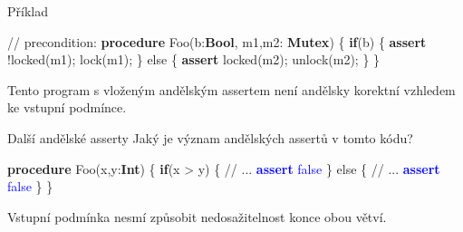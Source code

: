 \documentclass[11pt]{beamer}
\begin{document}


% 
\begin{frame}[fragile]{Příklad}
\begin{semiverbatim} \small
// precondition: 
\textbf{procedure} Foo(b:\textbf{Bool}, m1,m2: \textbf{Mutex}) \{ \pause
{}
  \textbf{if}(b) \{
    \textbf{assert} !locked(m1); lock(m1);
  \} else \{
    \textbf{assert} locked(m2); unlock(m2);
  \}
\}
\end{semiverbatim}
Tento program s vloženým andělským assertem není
andělsky korektní vzhledem ke vstupní podmínce.
\end{frame}


\begin{frame}[fragile]{Další andělské asserty}
Jaký je význam andělských assertů v tomto kódu?
\begin{semiverbatim}
\textbf{procedure} Foo(x,y:\textbf{Int}) \{
  \textbf{if}(x > y) \{
    // ...
    \textcolor{blue}{\textbf{assert} false}
  \} else \{
    // ...
    \textcolor{blue}{\textbf{assert} false}
  \}
\}
\end{semiverbatim}
\pause Vstupní podmínka nesmí způsobit nedosažitelnost konce obou větví.
\end{frame}
\end{document}
